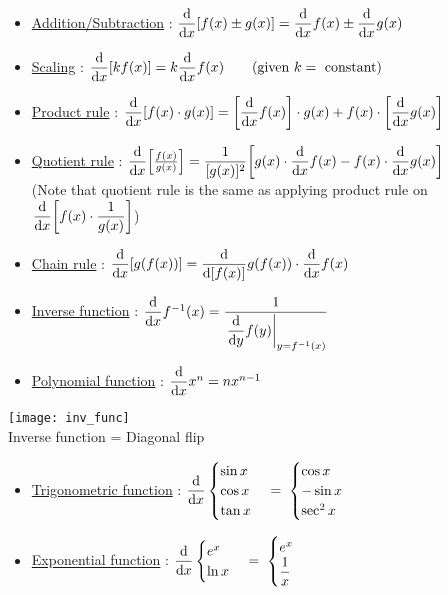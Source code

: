\documentclass[class=article, crop=false, 12pt]{standalone}
\begin{document}
\begin{itemize}
    \item \ul{Addition/Subtraction} : $\dvv{x}[f(x)\pm g(x)] = \dvv{x}f(x) \pm \dvv{x}g(x)$
    
    \item \ul{Scaling} : $\dvv{x}[kf(x)] = k\dvv{x}f(x)\qquad (\text{given }k = \text{ constant})$

    \item \ul{Product rule} : $\dvv{x}[f(x)\cdot g(x)] = \qty[\dvv{x}f(x)]\cdot g(x) + f(x)\cdot \qty[\dvv{x} g(x)]$
    
    \item \ul{Quotient rule} : $\dvv{x}\qty[\frac{f(x)}{g(x)}] = \dinv{[g(x)]^2}\qty[g(x)\cdot \dvv{x}f(x) - f(x)\cdot \dvv{x}g(x)]$ \\[1em]
        (Note that quotient rule is the same as applying product rule on $\displaystyle \dvv{x}\qty[f(x)\cdot \inv{g(x)}]$)
    
    \item \ul{Chain rule} : $\dvv{x}[g(f(x))] = \dvv{[f(x)]}g(f(x)) \cdot \dvv{x}f(x)$
\end{itemize}

\begin{minipage}{0.6\textwidth}
    \begin{itemize}
    \item \ul{Inverse function} : $\dvv{x} f^{-1}(x) = \dinv{\eval{\dvv{y}f(y)}_{y=f^{-1}(x)}}$
        
    
    \item \ul{Polynomial function} : $\dvv{x} x^n = nx^{n-1}$
    

    \end{itemize}
\end{minipage}
%
\begin{minipage}{0.4\textwidth}
    \centering
    \texttt{[image: inv\_func]}
    \\
    \scriptsize Inverse function = Diagonal flip
\end{minipage}


\begin{itemize}
        \item \ul{Trigonometric function} : $\dvv{x} 
        \begin{cases} \sin{x}\\ \cos{x}\\ \tan{x} \end{cases}
        =\;
        \begin{cases} \cos{x}\\ -\sin{x}\\ \sec^2{x} \end{cases}
        $

    \item \ul{Exponential function} : $\dvv{x} 
        \begin{cases} e^{x}\\ \ln{x} \end{cases}
        =\;
        \begin{cases} e^{x}\\ \dinv{x} \end{cases}
        $
\end{itemize}
\end{document}
